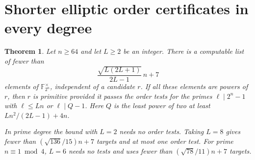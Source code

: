 \documentclass[11pt]{article}
\newtheorem{theorem}{Theorem}
\begin{document}
\section{Shorter elliptic order certificates in every degree}
\label{sec:quadratic-ray}
\begin{theorem}\label{thm:quadratic-ray}
Let \(n\ge64\) and let \(L\ge2\) be an integer. There is a computable
list of fewer than
\[
       \frac{\sqrt{L(2L+1)}}{2L-1}\,n+7
\]
elements of \(\mathbb F_{2^n}^\times\), independent of a candidate
\(r\). If all these elements are powers of \(r\), then \(r\) is
primitive provided it passes the order tests for the primes
\(\ell\mid 2^n-1\) with \(\ell\le Ln\) or \(\ell\mid Q-1\).
Here \(Q\) is the least power of two at least \(Ln^2/(2L-1)+4n\).

In prime degree the bound with \(L=2\) needs no order tests.
Taking \(L=8\) gives fewer than \((\sqrt{136}/15)n+7\) targets
and at most one order test. For prime \(n\equiv1\bmod4\),
\(L=6\) needs no tests and uses fewer than \((\sqrt{78}/11)n+7\) targets.
\end{theorem}
\end{document}
